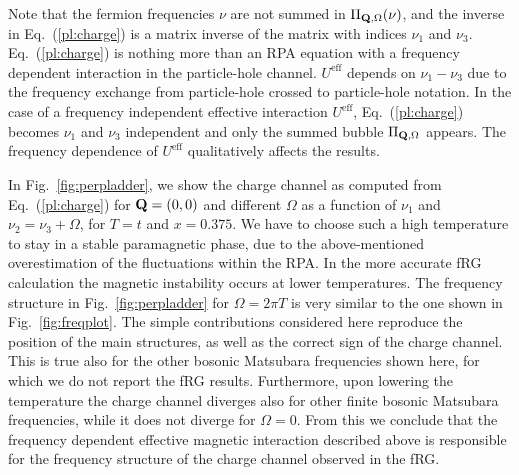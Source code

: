 Note that the fermion frequencies $\nu$ are not summed in $\Pi_{\mathbf{Q},\Omega}(\nu)$, and the inverse in Eq.~(\ref{pl:charge}) is a matrix inverse of the matrix with indices $\nu_1$ and $\nu_3$.
Eq.~(\ref{pl:charge}) is nothing more than an RPA equation with a frequency dependent interaction in the particle-hole channel.\cite{Rohringer2012} $U^{\mathrm{eff}}$ depends on $\nu_1-\nu_3$ due to the frequency exchange from particle-hole crossed to particle-hole notation.
In the case of a frequency independent effective interaction $U^{\mathrm{eff}}$, Eq.~(\ref{pl:charge}) becomes $\nu_1$ and $\nu_3$ independent 
and only the summed bubble $\Pi_{\mathbf{Q},\Omega}$ appears.
The frequency dependence of $U^{\mathrm{eff}}$ qualitatively affects the results. 

In Fig.~\ref{fig:perpladder}, we show the charge channel as computed from Eq.~(\ref{pl:charge}) for $\mathbf{Q}=(0,0)$ and different $\Omega$ as a function of $\nu_1$ and $\nu_2 = \nu_3 + \Omega$, for $T=t$ and $x=0.375$.
We have to choose such a high temperature to stay in a stable paramagnetic phase, due to the above-mentioned overestimation of the fluctuations within the RPA. In the more accurate fRG calculation the magnetic instability occurs at lower temperatures.
The frequency structure in Fig.~\ref{fig:perpladder} for $\Omega=2\pi T$ is very similar to the one shown in Fig.~\ref{fig:freqplot}. 
The simple contributions considered here reproduce the position of the main structures, as well as the correct sign of the charge channel. 
This is true also for the other bosonic Matsubara frequencies shown here, for which we do not report the fRG results. 
Furthermore, upon lowering the temperature the charge channel diverges also for other finite bosonic Matsubara frequencies, while it does not diverge for $\Omega=0$.
From this we conclude that the frequency dependent effective magnetic interaction described above is responsible for the frequency structure of the charge channel observed in the fRG. 

